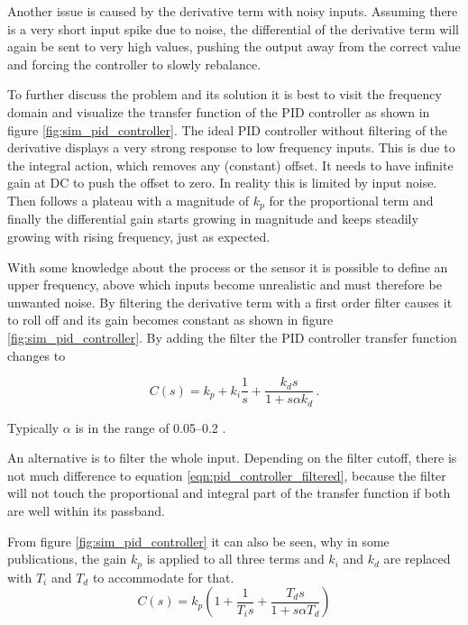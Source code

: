 Another issue is caused by the derivative term with noisy inputs. Assuming there is a very short input spike due to noise, the differential of the derivative term will again be sent to very high values, pushing the output away from the correct value and forcing the controller to slowly rebalance.

To further discuss the problem and its solution it is best to visit the frequency domain and visualize the transfer function of the PID controller as shown in figure \ref{fig:sim_pid_controller}. The ideal PID controller without filtering of the derivative displays a very strong response to low frequency inputs. This is due to the integral action, which removes any (constant) offset. It needs to have infinite gain at DC to push the offset to zero. In reality this is limited by input noise. Then follows a plateau with a magnitude of $k_p$ for the proportional term and finally the differential gain starts growing in magnitude and keeps steadily growing with rising frequency, just as expected.

With some knowledge about the process or the sensor it is possible to define an upper frequency, above which inputs become unrealistic and must therefore be unwanted noise. By filtering the derivative term with a first order filter causes it to roll off and its gain becomes constant as shown in figure \ref{fig:sim_pid_controller}. By adding the filter the PID controller transfer function changes to

\begin{equation}
    C(s) = k_p + k_i \frac{1}{s} + \frac{k_d s}{1 + s \alpha k_d} \,. \label{eqn:pid_controller_filtered}
\end{equation}

Typically $\alpha$ is in the range of \numrange{0.05}{0.2} \citep[p. 129]{pid_controller}.

An alternative is to filter the whole input. Depending on the filter cutoff, there is not much difference to equation \ref{eqn:pid_controller_filtered}, because the filter will not touch the proportional and integral part of the transfer function if both are well within its passband.

From figure \ref{fig:sim_pid_controller} it can also be seen, why in some publications, the gain $k_p$ is applied to all three terms and $k_i$ and $k_d$ are replaced with $T_i$ and $T_d$ to accommodate for that.
\begin{equation}
    C(s) = k_p \left(1 + \frac{1}{T_i s} + \frac{T_d s}{1 + s \alpha T_d} \right) \label{eqn:pid_controller_series}
\end{equation}

